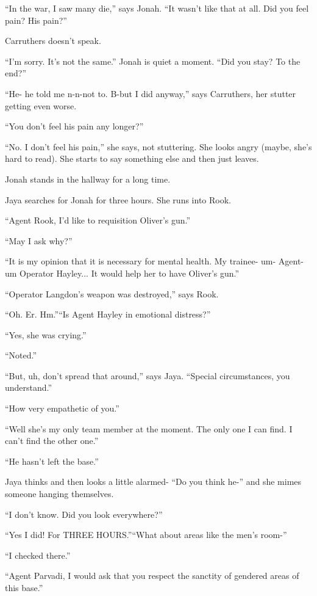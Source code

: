``In the war, I saw many die,'' says Jonah.  ``It wasn't like that at all.  Did you feel pain? His pain?''

Carruthers doesn't speak.

``I'm sorry.  It's not the same.''  Jonah is quiet a moment.  ``Did you stay?  To the end?''

``He- he told me n-n-not to.  B-but I did anyway,'' says Carruthers, her stutter getting even worse.

``You don't feel his pain any longer?''

``No.  I don't feel his pain,'' she says, not stuttering.  She looks angry (maybe, she's hard to read).  She starts to say something else and then just leaves.

Jonah stands in the hallway for a long time.





Jaya searches for Jonah for three hours.  She runs into Rook.

``Agent Rook, I'd like to requisition Oliver's gun.''

``May I ask why?''

``It is my opinion that it is necessary for mental health.  My trainee- um- Agent- um Operator Hayley... It would help her to have Oliver's gun.''

``Operator Langdon's weapon was destroyed,'' says Rook.

``Oh.  Er.  Hm.''``Is Agent Hayley in emotional distress?''

``Yes, she was crying.''

``Noted.''

``But, uh, don't spread that around,'' says Jaya.  ``Special circumstances, you understand.''

``How very empathetic of you.''

``Well she's my only team member at the moment.  The only one I can find.  I can't find the other one.''

``He hasn't left the base.''

Jaya thinks and then looks a little alarmed- ``Do you think he-'' and she mimes someone hanging themselves.

``I don't know.  Did you look everywhere?''

``Yes I did!  For THREE HOURS.''``What about areas like the men's room-''

``I checked there.''

``Agent Parvadi, I would ask that you respect the sanctity of gendered areas of this base.''

